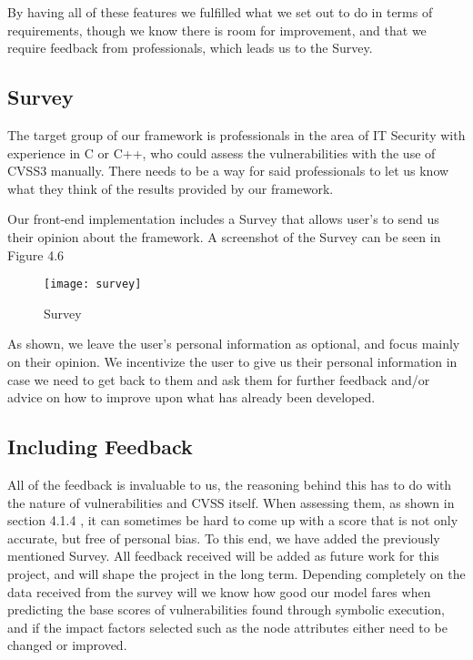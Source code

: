 By having all of these features we fulfilled what we set out to do in terms of requirements, though we know there is room for improvement, and that we require feedback from professionals, which leads us to the Survey.

\subsection{Survey}

The target group of our framework is professionals in the area of IT Security with experience in C or C++, who could assess the vulnerabilities with the use of CVSS3 manually. There needs to be a way for said professionals to let us know what they think of the results provided by our framework.

Our front-end implementation includes a Survey that allows user's to send us their opinion about the framework. A screenshot of the Survey can be seen in Figure 4.6

\begin{figure}[H]
	\caption{Survey}
	\centering
	\texttt{[image: survey]}
\end{figure}

As shown, we leave the user's personal information as optional, and focus mainly on their opinion. We incentivize the user to give us their personal information in case we need to get back to them and ask them for further feedback and/or advice on how to improve upon what has already been developed.

\subsection{Including Feedback}

All of the feedback is invaluable to us, the reasoning behind this has to do with the nature of vulnerabilities and CVSS itself. When assessing them, as shown in section 4.1.4 , it can sometimes be hard to come up with a score that is not only accurate, but free of personal bias. To this end, we have added the previously mentioned Survey. All feedback received will be added as future work for this project, and will shape the project in the long term. Depending completely on the data received from the survey will we know how good our model fares when predicting the base scores of vulnerabilities found through symbolic execution, and if the impact factors selected such as the node attributes either need to be changed or improved.

